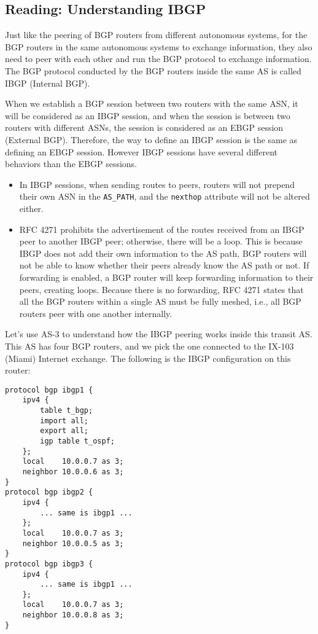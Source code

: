 \subsection{Reading: Understanding IBGP} 

Just like the peering of BGP routers from different
autonomous systems, for the BGP routers in the same
autonomous systems to exchange information, they
also need to peer with each other and run the BGP
protocol to exchange information.
The BGP protocol conducted by the BGP routers
inside the same AS is called IBGP (Internal BGP).

When we establish a BGP session between two routers with the same ASN, it will be considered
as an IBGP session, and when the session is between two routers with different ASNs, the session
is considered as an EBGP session (External BGP).
Therefore, the way to define
an IBGP session is the same as defining an EBGP session.
However IBGP sessions have several different behaviors 
than the EBGP sessions.


\begin{itemize}
\item In IBGP sessions, when sending routes to peers,
routers will not prepend their own ASN in the \texttt{AS\_PATH},
and the \texttt{nexthop} attribute will not be altered either.

\item RFC 4271 prohibits the advertisement of the routes received from 
an IBGP peer to another IBGP peer; otherwise, there will be a loop.
This is because IBGP does not add their own information
to the AS path, BGP routers will not be able to know whether
their peers already know the AS path or not. If forwarding
is enabled, a BGP router will keep forwarding information
to their peers, creating loops. 
Because there is no forwarding, 
RFC 4271 states that all the BGP routers within a single AS must be 
fully meshed, i.e., all BGP routers peer with one another internally.
\end{itemize}


Let's use AS-3 to understand how the IBGP peering works inside 
this transit AS. 
This AS has four BGP routers, and we pick the one 
connected to the IX-103 (Miami) Internet exchange.
The following is the IBGP configuration on this router:

\begin{lstlisting}
protocol bgp ibgp1 {
    ipv4 {
        table t_bgp;
        import all;
        export all;
        igp table t_ospf;
    };
    local    10.0.0.7 as 3;
    neighbor 10.0.0.6 as 3;
}
protocol bgp ibgp2 {
    ipv4 {
        ... same is ibgp1 ...
    };
    local    10.0.0.7 as 3;
    neighbor 10.0.0.5 as 3;
}
protocol bgp ibgp3 {
    ipv4 {
        ... same is ibgp1 ...
    };
    local    10.0.0.7 as 3;
    neighbor 10.0.0.8 as 3;
}
\end{lstlisting}


